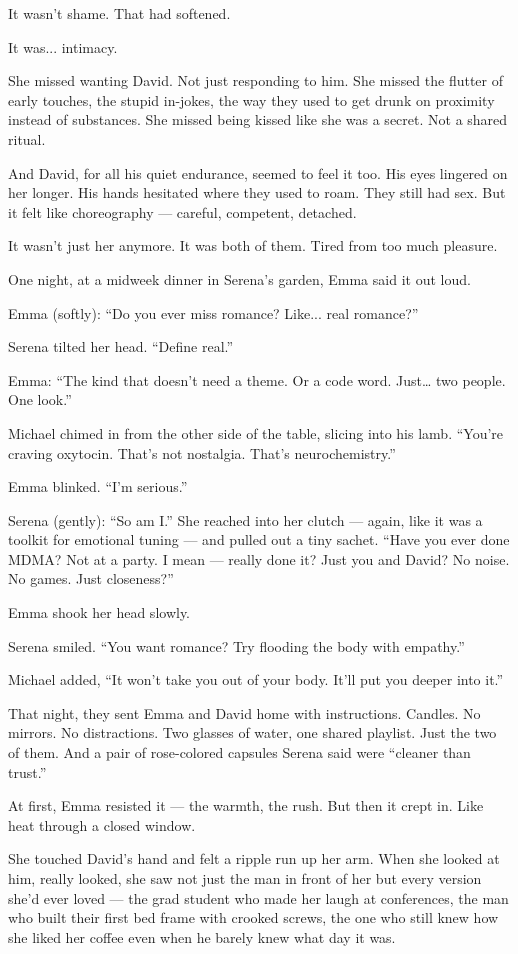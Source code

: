 It wasn’t shame. That had softened.

It was... intimacy.

She missed wanting David. Not just responding to him. She missed the flutter of early touches, the 
stupid in-jokes, the way they used to get drunk on proximity instead of substances. She missed 
being kissed like she was a secret. Not a shared ritual.

And David, for all his quiet endurance, seemed to feel it too. His eyes lingered on her longer. 
His hands hesitated where they used to roam. They still had sex. But it felt like choreography — 
careful, competent, detached.

It wasn’t just her anymore. It was both of them. Tired from too much pleasure.

One night, at a midweek dinner in Serena’s garden, Emma said it out loud.

Emma (softly):
“Do you ever miss romance? Like... real romance?”

Serena tilted her head. “Define real.”

Emma:
“The kind that doesn’t need a theme. Or a code word. Just… two people. One look.”

Michael chimed in from the other side of the table, slicing into his lamb.
“You’re craving oxytocin. That’s not nostalgia. That’s neurochemistry.”

Emma blinked. “I’m serious.”

Serena (gently):
“So am I.”
She reached into her clutch — again, like it was a toolkit for emotional tuning — and pulled 
out a tiny sachet.
“Have you ever done MDMA? Not at a party. I mean — really done it? Just you and David? No 
noise. No games. Just closeness?”

Emma shook her head slowly.

Serena smiled. “You want romance? Try flooding the body with empathy.”

Michael added, “It won’t take you out of your body. It’ll put you deeper into it.”

That night, they sent Emma and David home with instructions. Candles. No mirrors. No 
distractions. Two glasses of water, one shared playlist. Just the two of them. And a pair 
of rose-colored capsules Serena said were “cleaner than trust.”

At first, Emma resisted it — the warmth, the rush. But then it crept in. Like heat through 
a closed window.

She touched David’s hand and felt a ripple run up her arm. When she looked at him, really 
looked, she saw not just the man in front of her but every version she’d ever loved — the 
grad student who made her laugh at conferences, the man who built their first bed frame 
with crooked screws, the one who still knew how she liked her coffee even when he barely 
knew what day it was.

